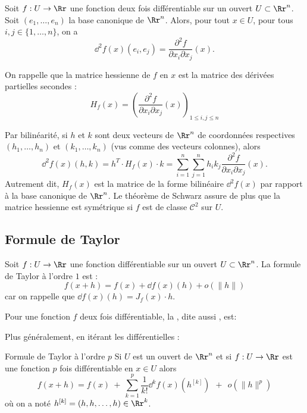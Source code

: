 Soit $f: U \to \Rr$ une fonction deux fois différentiable sur un ouvert $U \subset \Rr^n$.
Soit $(e_1,\ldots,e_n)$ la base canonique de $\Rr^n$.
Alors, pour tout $x \in U$, pour tous $i,j \in \{1,\ldots,n\}$, on a
$$\dd^2 f(x) (e_i,e_j) =\frac{\partial^2 f}{\partial x_i\partial x_j}(x).$$

On rappelle que la matrice hessienne de $f$ en $x$ est la matrice des dérivées partielles secondes :
$$H_f(x) = \left( \frac{\partial ^2f}{\partial x_i\partial x_j}(x) \right)_{1 \le i,j \le n}$$

Par bilinéarité, si $h$ et $k$ sont deux vecteurs de $\Rr^n$ de coordonnées respectives $(h_1,\ldots,h_n)$ et $(k_1,\ldots,k_n)$ (vus comme des vecteurs colonnes), alors
$$\dd^2 f (x) (h,k)= h^T \cdot  H_f(x) \cdot k 
= \sum_{i=1}^n \sum_{j=1}^n h_ik_j   \frac{\partial^2 f}{\partial x_i \partial x_j}(x).$$
Autrement dit, $H_f(x)$ est la matrice de la forme bilinéaire $\dd^2f(x)$ par rapport
à la base canonique de $\Rr^n$. Le théorème de Schwarz assure de plus que la matrice hessienne est symétrique si $f$ est de classe $\mathcal{C}^2$ sur $U$.


\subsection{Formule de Taylor}

Soit $f: U \to \Rr$ une fonction différentiable sur un ouvert $U \subset \Rr^n$.
La formule de Taylor à l'ordre $1$ est :
$$f(x+h) = f(x) + \dd f(x)(h) +  o\left(\|h\|\right)$$
car on rappelle que $\dd f(x) (h) = J_f(x) \cdot h$.

Pour une fonction $f$ deux fois différentiable, la , dite aussi , est:


Plus généralement, en itérant les différentielles :
\begin{theoreme}{Formule de Taylor à l'ordre $p$}{}
Si $U$ est un ouvert de $\Rr^n$ et si $f: U \to \Rr$ est une fonction $p$ fois différentiable en $x \in U$ alors
$$
f(x+h) = f(x) \  + \  \sum_{k=1}^p{\dfrac{1}{k!} \dd^k f (x) (h^{[k]})} \ \  + \ \ o\left(\|h\|^p\right)
$$
où on a noté $h^{[k]} = (h,h,\ldots,h) \in \Rr^k$.
\end{theoreme}



